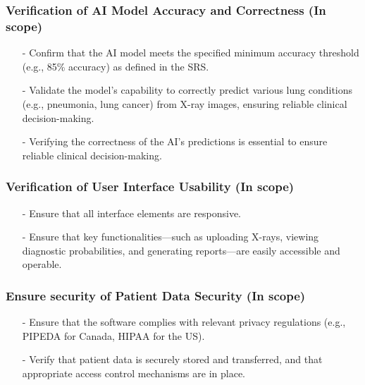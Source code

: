 \documentclass[12pt, titlepage]{article}
\begin{document}
    \subsubsection{Verification of AI Model Accuracy and Correctness (In scope)}
    \begin{itemize}
        \item[-] Confirm that the AI model meets the specified minimum accuracy threshold (e.g., 85\% accuracy) as defined in the SRS.
        \item[-] Validate the model’s capability to correctly predict various lung conditions (e.g., pneumonia, lung cancer) from X-ray images, ensuring reliable clinical decision-making.
        \item[-] Verifying the correctness of the AI's predictions is essential to ensure reliable clinical decision-making.
    \end{itemize}
    
    \subsubsection{Verification of User Interface Usability (In scope)}
    \begin{itemize}
        \item[-] Ensure that all interface elements are responsive.
        \item[-] Ensure that key functionalities—such as uploading X-rays, viewing diagnostic probabilities, and generating reports—are easily accessible and operable.
        
        
    \end{itemize}
    
    \subsubsection{Ensure security of Patient Data Security (In scope)}
    \begin{itemize}
        \item[-] Ensure that the software complies with relevant privacy regulations (e.g., PIPEDA for Canada, HIPAA for the US).
        \item[-] Verify that patient data is securely stored and transferred, and that appropriate access control mechanisms are in place.

    \end{itemize}
    
\end{document}
